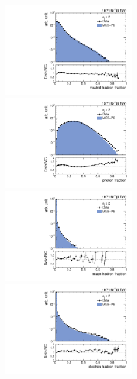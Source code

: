 \begin{figure}[!htbp]
 \begin{center}
 \vspace*{-1mm}
 \hspace*{-2mm}\includegraphics[width=0.51\textwidth]{Plots_HT_2_150/Comparison_NuHadFrac_2_HT_2_150.pdf}%
 ~~\includegraphics[width=0.51\textwidth]{Plots_HT_2_150/Comparison_PhFrac_2_HT_2_150.pdf}\\
 \vspace*{1mm}
 \hspace*{-2mm}\includegraphics[width=0.51\textwidth]{Plots_HT_2_150/Comparison_MuFrac_2_HT_2_150.pdf}%
 ~~\includegraphics[width=0.51\textwidth]{Plots_HT_2_150/Comparison_ElFrac_2_HT_2_150.pdf}\\

\end{center}
\end{figure}
